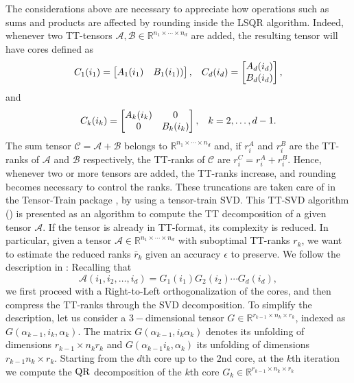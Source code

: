 \documentclass{siamart190516}
\newcommand{\cc}[1]{\mathcal{#1}}
\newcommand{\bb}[1]{\mathbb{#1}}
\newcommand{\cA}{\cc A}
\newcommand{\cB}{\cc B}
\begin{document}
The considerations above are necessary to appreciate how operations such as sums and products are affected by rounding inside the LSQR algorithm. Indeed, whenever two TT-tensors $\cA,\cB\in\bb{R}^{n_1\times \cdots \times n_d}$ are added, the resulting tensor will have cores defined as
\[
C_1(i_1) = \begin{bmatrix} A_1(i_1) &  B_1(i_1))\\ \end{bmatrix}, \hspace{.3cm} C_d(i_d)=\begin{bmatrix}
    A_d(i_d) \\ B_d(i_d)\\ 
\end{bmatrix},
\]
and 
\[
C_k(i_k) = \begin{bmatrix}
    A_k(i_k) & 0 \\ 0 & B_k(i_k)\\ 
\end{bmatrix}, \hspace{.3cm} k = 2,\ldots, d-1.
\]
The sum tensor $\cc{C} = \cA + \cB$ belongs to $\bb{R}^{n_1\times \cdots \times n_d}$ and, if $r^A_i$ and $r^B_i$ are the TT-ranks of $\cA$ and $\cB$ respectively, the TT-ranks of $\cc{C}$ are $r^C_i = r^A_i + r^B_i$. Hence, whenever two or more tensors are added, the TT-ranks increase, and rounding becomes necessary to control the ranks. 
These truncations are taken care of in the Tensor-Train package \cite{software_tt}, by using a tensor-train
SVD.
%
This TT-SVD algorithm (\cite{Oseledets.2011}) is presented as an algorithm to compute the TT decomposition of a given tensor $\cA$. If the tensor is already in TT-format, its complexity is reduced. In particular, given a tensor $\cA\in\bb{R}^{n_1\times \cdots \times n_d}$ with suboptimal TT-ranks $r_k$, we want to estimate the reduced ranks $\bar{r}_k$ given an accuracy $\epsilon$ to preserve. We follow the
description in \cite{Oseledets.2011}: Recalling that
\[
\cA(i_1, i_2, \ldots, i_d) = G_1(i_1) G_2(i_2) \cdots G_d(i_d),
\]
we first proceed with a Right-to-Left orthogonalization of the cores, and then compress the TT-ranks through the SVD decomposition. To simplify the description, let us consider a $3-$dimensional tensor $G\in\bb{R}^{r_{k-1}\times n_k \times r_k}$, indexed as $G(\alpha_{k-1},i_k,\alpha_k)$.  The matrix $G(\alpha_{k-1},i_k \alpha_k)$ denotes its unfolding of dimensions $r_{k-1}\times n_k r_k$ and  $G(\alpha_{k-1}i_k, \alpha_k)$ its unfolding of dimensions $r_{k-1}n_k \times r_k$. Starting from the $d$th core up to the $2$nd core, at the $k$th iteration we compute the ${\rm QR}$ decomposition of the $k$th core $G_k \in \bb{R}^{r_{k-1}\times n_k \times r_k}$
\end{document}
